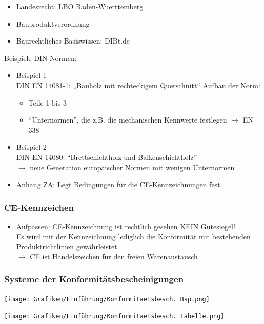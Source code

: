 \documentclass[fleqn,twoside]{article}
\begin{document}
    \begin{itemize}
        \item Landesrecht: LBO Baden-Wuerttemberg
        \item Bauproduktverordnung
        \item Baurechtliches Basiswissen: DIBt.de
    \end{itemize}
        Beispiele DIN-Normen:
        \begin{itemize}
            \item Beispiel 1\\
                DIN EN 14081-1: „Bauholz mit rechteckigem Querschnitt“
                Aufbau der Norm:
                \begin{itemize}
                    \item Teile 1 bis 3
                    \item \enquote{Unternormen}, die z.B. die mechanischen Kennwerte festlegen $\rightarrow$ EN 338
                \end{itemize}
            \item Beispiel 2\\
                DIN EN 14080: \enquote{Brettschichtholz und Balkenschichtholz} \\ 
                $\rightarrow$ neue Generation europäischer Normen mit wenigen Unternormen
        \end{itemize}
        \begin{itemize}
            \item Anhang ZA: Legt Bedingungen für die CE-Kennzeichnungen fest
        \end{itemize}
    
    \subsubsection{CE-Kennzeichen}
        \begin{itemize}
            \item Aufpassen: CE-Kennzeichnung ist rechtlich gesehen KEIN Gütesiegel!\\
            Es wird mit der Kennzeichnung lediglich die Konformität mit bestehenden Produktrichtlinien gewährleistet\\
            $\rightarrow$ CE ist Handelszeichen für den freien Warenaustausch
        \end{itemize}
    
    \subsubsection{Systeme der Konformitätsbescheinigungen}
        \begin{minipage}{0.5\textwidth}
            \texttt{[image: Grafiken/Einführung/Konformitaetsbesch. Bsp.png]}
        \end{minipage}
        \begin{minipage}{0.5\textwidth}
            \texttt{[image: Grafiken/Einführung/Konformitaetsbesch. Tabelle.png]}
        \end{minipage}
\end{document}
